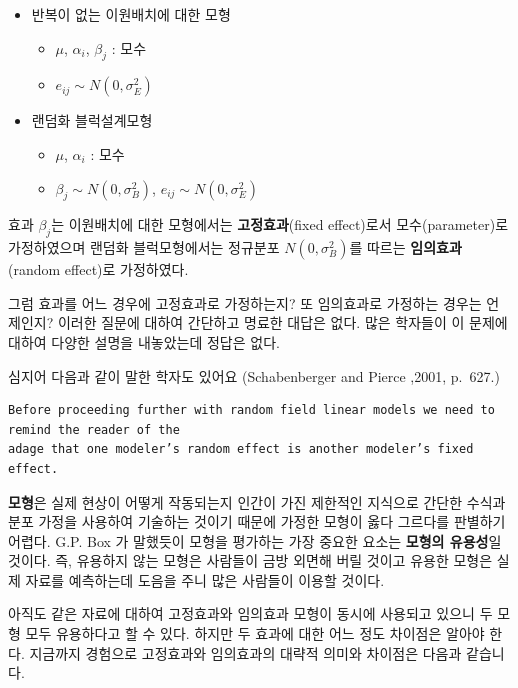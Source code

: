 \documentclass[
]{book}
\providecommand{\tightlist}{%
  \setlength{\itemsep}{0pt}\setlength{\parskip}{0pt}}
\theoremstyle{definition}
\theoremstyle{definition}
\theoremstyle{definition}
\theoremstyle{remark}
\begin{document}
\begin{itemize}
\tightlist
\item
  반복이 없는 이원배치에 대한 모형

  \begin{itemize}
  \tightlist
  \item
    \(\mu\), \(\alpha_i\), \(\beta_j\) : 모수
  \item
    \(e_{ij} \sim N(0, \sigma^2_E)\)
  \end{itemize}
\item
  랜덤화 블럭설계모형

  \begin{itemize}
  \tightlist
  \item
    \(\mu\), \(\alpha_i\) : 모수
  \item
    \(\beta_j \sim N(0, \sigma^2_B)\), \(e_{ij} \sim N(0, \sigma^2_E)\)
  \end{itemize}
\end{itemize}

효과 \(\beta_j\)는 이원배치에 대한 모형에서는 \textbf{고정효과}(fixed effect)로서 모수(parameter)로 가정하였으며 랜덤화 블럭모형에서는 정규분포 \(N(0, \sigma^2_B)\)를 따르는 \textbf{임의효과}(random effect)로 가정하였다.

그럼 효과를 어느 경우에 고정효과로 가정하는지? 또 임의효과로 가정하는 경우는 언제인지? 이러한 질문에 대하여 간단하고 명료한 대답은 없다. 많은 학자들이 이 문제에 대하여 다양한 설명을 내놓았는데 정답은 없다.

심지어 다음과 같이 말한 학자도 있어요 (Schabenberger and Pierce ,2001, p.~627.)

\begin{verbatim}
Before proceeding further with random field linear models we need to remind the reader of the 
adage that one modeler’s random effect is another modeler’s fixed effect.
\end{verbatim}

\textbf{모형}은 실제 현상이 어떻게 작동되는지 인간이 가진 제한적인 지식으로 간단한 수식과 분포 가정을 사용하여 기술하는 것이기 때문에 가정한 모형이 옳다 그르다를 판별하기 어렵다. G.P. Box 가 말했듯이 모형을 평가하는 가장 중요한 요소는 \textbf{모형의 유용성}일 것이다. 즉, 유용하지 않는 모형은 사람들이 금방 외면해 버릴 것이고 유용한 모형은 실제 자료를 예측하는데 도음을 주니 많은 사람들이 이용할 것이다.

아직도 같은 자료에 대하여 고정효과와 임의효과 모형이 동시에 사용되고 있으니 두 모형 모두 유용하다고 할 수 있다. 하지만 두 효과에 대한 어느 정도 차이점은 알아야 한다. 지금까지 경험으로 고정효과와 임의효과의 대략적 의미와 차이점은 다음과 같습니다.
\end{document}
